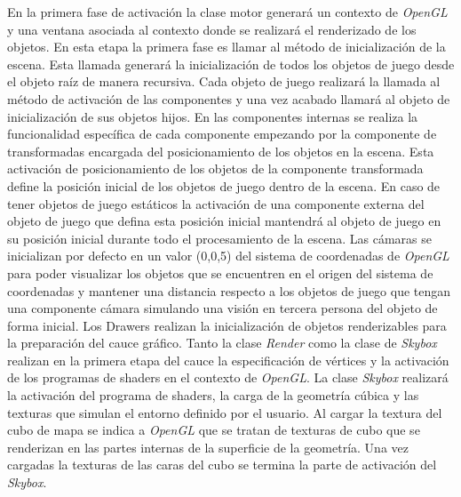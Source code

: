 \documentclass[a4paper]{book}
\begin{document}
En la primera fase de activación la clase motor generará un contexto de \textit{OpenGL} y una ventana asociada al contexto donde se
realizará el renderizado de los objetos. En esta etapa la primera fase es llamar al método de inicialización de la escena. Esta llamada
generará la inicialización de todos los objetos de juego desde el objeto raíz de manera recursiva. Cada objeto de juego realizará la
llamada al método de activación de las componentes y una vez acabado llamará al objeto de inicialización
de sus objetos hijos. En las componentes internas se realiza la funcionalidad específica de cada componente empezando por la componente
de transformadas encargada del posicionamiento de los objetos en la escena. Esta activación de posicionamiento de los objetos de la
componente transformada define la posición inicial de los objetos de juego dentro de la escena. En caso de tener objetos de juego estáticos
la activación de una componente externa del objeto de juego que defina esta posición inicial mantendrá al objeto de juego en su posición
inicial durante todo el procesamiento de la escena. Las cámaras se inicializan por defecto en un valor (0,0,5) del sistema de coordenadas de
\textit{OpenGL} para poder visualizar los objetos que se encuentren en el origen del sistema de coordenadas y mantener una distancia respecto
a los objetos de juego que tengan una componente cámara simulando una visión en tercera persona del objeto de forma inicial. Los Drawers
realizan la inicialización de objetos renderizables para la preparación del cauce gráfico. Tanto la clase \textit{Render}
como la clase de \textit{Skybox} realizan en la primera etapa del cauce la especificación de vértices y la activación de los programas de
shaders en el contexto de  \textit{OpenGL}. La clase \textit{Skybox} realizará la activación del programa de shaders, la carga de la geometría 
cúbica y las texturas que simulan el entorno definido por el usuario. Al cargar la textura del cubo de mapa se indica a \textit{OpenGL} 
que se tratan de texturas de cubo que se renderizan en las partes internas de la superficie de la geometría. Una vez cargadas la texturas
de las caras del cubo se termina la parte de activación del \textit{Skybox}.
\end{document}
